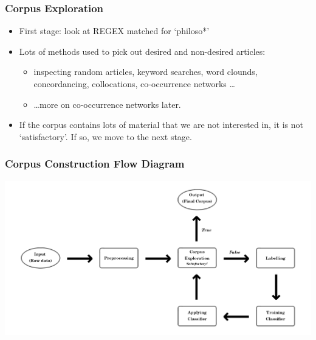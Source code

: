\documentclass[10pt, compress]{beamer}
\begin{document}
\begin{frame}
	\frametitle{Corpus Exploration}

	\pause

  \begin{itemize}[<+- | alert@+>]
		\item First stage: look at REGEX matched for `philoso*'
		\item Lots of methods used to pick out desired and non-desired articles:
		\begin{itemize}
			\item inspecting random articles, keyword searches, word clounds, concordancing, collocations, co-occurrence networks \ldots
			\item \ldots more on co-occurrence networks later.
		\end{itemize}
		\item If the corpus contains lots of material that we are not interested in, it is not `satisfactory'. If so, we move to the next stage.
	\end{itemize}

\end{frame}

\begin{frame}
	\frametitle{Corpus Construction Flow Diagram}
	\begin{center}
	\includegraphics[width=\textwidth]{images/flow_diagram.png}
	\end{center}
\end{frame}
\end{document}
